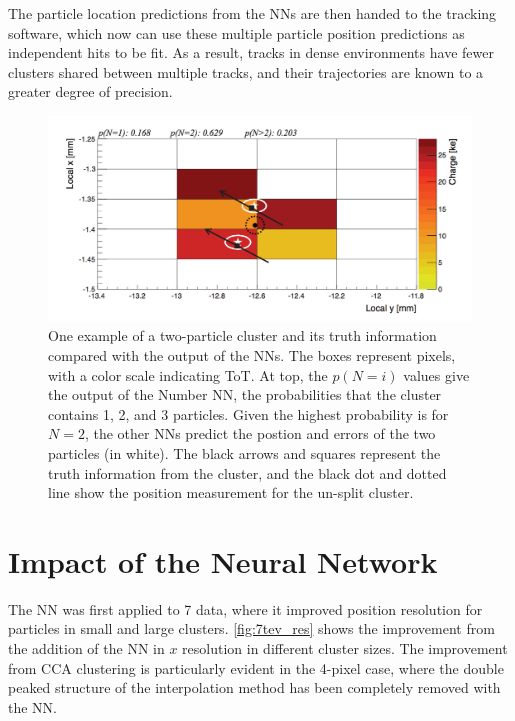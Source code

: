 The particle location predictions from the \acp{NN} are then handed to the tracking software, which now can use these multiple particle position predictions as independent hits to be fit. As a result, tracks in dense environments have fewer clusters shared between multiple tracks, and their trajectories are known to a greater degree of precision. 

\begin{centering}
\begin{figure}[bth]
\myfloatalign
\includegraphics[width=.90\linewidth]{figures/nn/merged_cluster.png}
\caption{One example of a two-particle cluster and its truth information compared with the output of the \acp{NN}. The boxes represent pixels, with a color scale indicating \ac{ToT}. At top, the $p(N=i)$ values give the output of the Number \ac{NN}, the probabilities that the cluster contains 1, 2, and 3 particles. Given the highest probability is for $N=2$, the other \acp{NN} predict the postion and errors of the two particles (in white). The black arrows and squares represent the truth information from the cluster, and the black dot and dotted line show the position measurement for the un-split cluster.}
\label{fig:merged_cluster}
\end{figure}
\end{centering}

\section{Impact of the Neural Network}

The \ac{NN} was first applied to 7 \tev data, where it improved position resolution for particles in small and large clusters. \autoref{fig:7tev_res} shows the improvement from the addition of the \ac{NN} in $x$ resolution in different cluster sizes. The improvement from \ac{CCA} clustering is particularly evident in the 4-pixel case, where the double peaked structure of the interpolation method has been completely removed with the \ac{NN}.  

